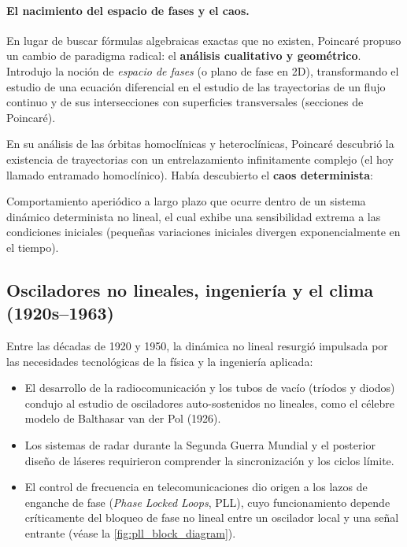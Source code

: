 \paragraph{El nacimiento del espacio de fases y el caos.}
En lugar de buscar fórmulas algebraicas exactas que no existen, Poincaré propuso un cambio de paradigma radical: el \textbf{análisis cualitativo y geométrico}. Introdujo la noción de \emph{espacio de fases} (o plano de fase en 2D), transformando el estudio de una ecuación diferencial en el estudio de las trayectorias de un flujo continuo y de sus intersecciones con superficies transversales (secciones de Poincaré).

En su análisis de las órbitas homoclínicas y heteroclínicas, Poincaré descubrió la existencia de trayectorias con un entrelazamiento infinitamente complejo (el hoy llamado entramado homoclínico). Había descubierto el \textbf{caos determinista}:
\begin{definition}
    Comportamiento aperiódico a largo plazo que ocurre dentro de un sistema dinámico determinista no lineal, el cual exhibe una sensibilidad extrema a las condiciones iniciales (pequeñas variaciones iniciales divergen exponencialmente en el tiempo).
\end{definition}

\subsection{Osciladores no lineales, ingeniería y el clima (1920s--1963)}

Entre las décadas de 1920 y 1950, la dinámica no lineal resurgió impulsada por las necesidades tecnológicas de la física y la ingeniería aplicada:
\begin{itemize}
    \item El desarrollo de la radiocomunicación y los tubos de vacío (tríodos y diodos) condujo al estudio de osciladores auto-sostenidos no lineales, como el célebre modelo de Balthasar van der Pol (1926).
    \item Los sistemas de radar durante la Segunda Guerra Mundial y el posterior diseño de láseres requirieron comprender la sincronización y los ciclos límite.
    \item El control de frecuencia en telecomunicaciones dio origen a los lazos de enganche de fase (\emph{Phase Locked Loops}, PLL), cuyo funcionamiento depende críticamente del bloqueo de fase no lineal entre un oscilador local y una señal entrante (véase la \cref{fig:pll_block_diagram}).
\end{itemize}

